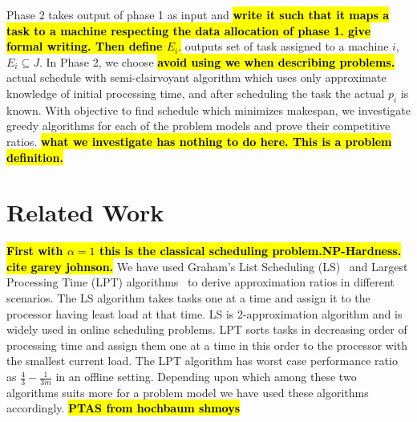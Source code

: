\documentclass[10pt, conference, compsocconf]{IEEEtran}
\newcommand{\todo}[1]{{\color{red}\textbf{\hl{#1}}\xspace}}
\begin{document}
Phase 2 takes output of phase 1 as input and \todo{write it such that
  it maps a task to a machine respecting the data allocation of phase
  1. give formal writing. Then define $E_i.$} outputs set of task
assigned to a machine $i$, $E_i \subseteq J$.  In Phase 2, we choose
\todo{avoid using we when describing problems.} actual schedule with
semi-clairvoyant algorithm which uses only approximate knowledge of
initial processing time, and after scheduling the task the actual
$p_i$ is known.  With objective to find schedule which minimizes
makespan, we investigate greedy algorithms for each of the problem
models and prove their competitive ratios. \todo{what we investigate
  has nothing to do here. This is a problem definition.}


\section{Related Work}\label{sec3}

\todo{First with $\alpha=1$ this is the classical scheduling
  problem.}\todo{NP-Hardness. cite garey johnson.} We have used
Graham's List Scheduling (LS)~\cite{Graham66} and Largest Processing
Time (LPT) algorithms~\cite{Graham69boundson} to derive approximation
ratios in different scenarios. The LS algorithm takes tasks one at a
time and assign it to the processor having least load at that time. LS
is 2-approximation algorithm and is widely used in online scheduling
problems. LPT sorts tasks in decreasing order of processing time and
assign them one at a time in this order to the processor with the
smallest current load. The LPT algorithm has worst case performance
ratio as $\frac{4}{3}-\frac{1}{3m} $ in an offline setting. Depending
upon which among these two algorithms suits more for a problem model
we have used these algorithms accordingly. \todo{PTAS from hochbaum shmoys}
\end{document}
